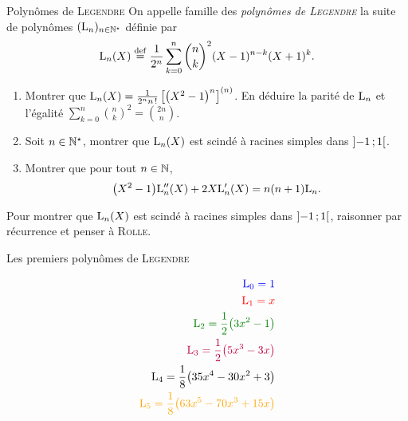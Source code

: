 \begin{defi}{Polynômes de \textsc{Legendre}}
    On appelle famille des \emph{polynômes de \textsc{Legendre}} la suite de polynômes $(\mathrm{L}_n)_{n \in \mathbb{N}^\star}$ définie par
    $$\mathrm{L}_n(X) \overset{\mathrm{\tiny def}}{=} \frac{1}{2^n} \sum_{k=0}^{n} \binom{n}{k}^2 (X-1)^{n-k}(X+1)^{k}.$$
\end{defi}


\begin{exercice}
    \begin{enumerate}
        \item Montrer que $\mathrm{L}_n(X) = \frac{1}{2^n n\,!} \left[ \big(X^2-1\big)^n \right]^{(n)}$. En déduire la parité de $\mathrm{L}_n$ et l'égalité $\sum\limits_{k=0}^n \binom{n}{k}^2 = \binom{2n}{n}$.
        \item Soit $n \in \mathbb{N}^\star$, montrer que $\mathrm{L}_n(X)$ est scindé à racines simples dans $\left]-1\,;1\right[$. 
        \item Montrer que pour tout $n \in \mathbb{N}$, $$\big(X^2-1\big) \mathrm{L}''_n(X) + 2X \mathrm{L}'_n(X) = n(n+1) \mathrm{L}_n.$$
    \end{enumerate}
\end{exercice}  

\begin{elem_sol}
    Pour montrer que $\mathrm{L}_n(X)$ est scindé à racines simples dans $\left]-1\,;1\right[$, raisonner par récurrence et penser à \textsc{Rolle}. 
\end{elem_sol}

\begin{marginfigure}[-11.5cm]
    \centering
	
	\caption*{\centering Les premiers polynômes de \textsc{Legendre}}
	\small
	\begin{align*}
	    \color{blue} \Leg_0 = 1 \\
	    \color{red} \Leg_1 = x \\
	    \color{green} \Leg_2 = \frac{1}{2}\big(3x^2-1\big) \\
	    \color{purple} \Leg_3 = \frac{1}{2}\big(5x^3-3x\big) \\
	    \color{black} \Leg_4 = \frac{1}{8}\big(35x^4-30x^2+3\big) \\
	    \color{orange} \Leg_5 = \frac{1}{8}\big(63x^5-70x^3+15x\big)
	\end{align*}
\end{marginfigure}

